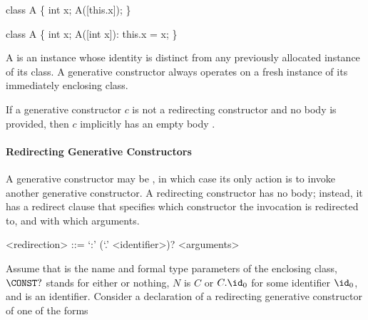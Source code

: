 \documentclass[makeidx]{article}
\begin{document}

\begin{dartCode}
class A \{
  int x;
  A([this.x]);
\}
\end{dartCode}


\begin{dartCode}
class A \{
  int x;
  A([int x]): this.x = x;
\}
\end{dartCode}

\LMHash{}%
A  is an instance whose identity is distinct from
any previously allocated instance of its class.
A generative constructor always operates on a fresh instance of
its immediately enclosing class.


\LMHash{}%
If a generative constructor $c$ is not a redirecting constructor
and no body is provided, then $c$ implicitly has an empty body \code{\{\}}.


\paragraph{Redirecting Generative Constructors}

\LMHash{}%
A generative constructor may be
,
in which case its only action is to invoke another generative constructor.
A redirecting constructor has no body;
instead, it has a redirect clause that specifies
which constructor the invocation is redirected to,
and with which arguments.

\begin{grammar}
<redirection> ::= `:' \THIS{} (`.' <identifier>)? <arguments>
\end{grammar}

\def\ConstMetavar{\mbox{\CONST?}}

\LMHash{}%
%
Assume that
is the name and formal type parameters of the enclosing class,
\BlindDefineSymbol{\ConstMetavar}%
$\ConstMetavar$ stands for either \CONST{} or nothing,
$N$ is $C$ or $C.\id_0$ for some identifier $\id_0$,
%
and \id{} is an identifier.
Consider a declaration of a redirecting generative constructor
of one of the forms
\end{document}

